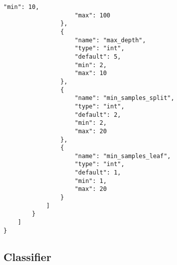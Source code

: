 \begin{Verbatim}[fontsize=\scriptsize]
                    "min": 10,
                    "max": 100
                },
                {
                    "name": "max_depth",
                    "type": "int",
                    "default": 5,
                    "min": 2,
                    "max": 10
                },
                {
                    "name": "min_samples_split",
                    "type": "int",
                    "default": 2,
                    "min": 2,
                    "max": 20
                },
                {
                    "name": "min_samples_leaf",
                    "type": "int",
                    "default": 1,
                    "min": 1,
                    "max": 20
                }
            ]
        }
    ]
}
\end{Verbatim}

\subsection{Classifier}
